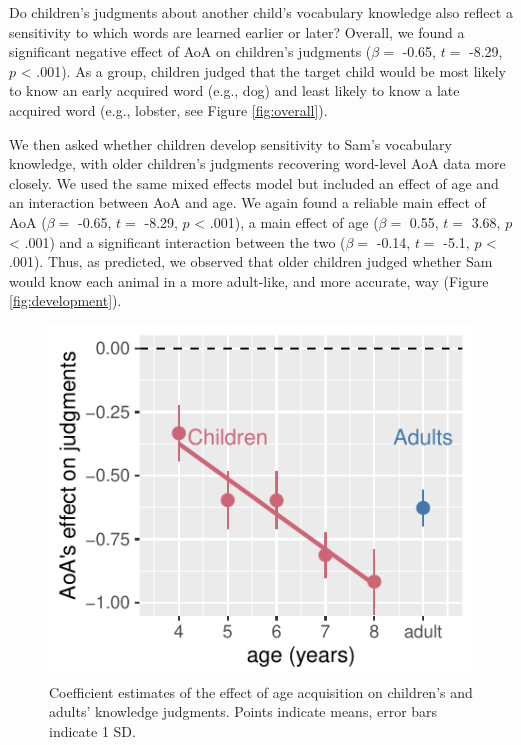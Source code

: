 \documentclass[10pt, letterpaper]{article}
\newenvironment{CodeChunk}{}{}
\begin{document}
Do children's judgments about another child's vocabulary knowledge also
reflect a sensitivity to which words are learned earlier or later?
Overall, we found a significant negative effect of AoA on children's
judgments (\(\beta =\) -0.65, \(t =\) -8.29, \(p\) \textless{} .001). As
a group, children judged that the target child would be most likely to
know an early acquired word (e.g., dog) and least likely to know a late
acquired word (e.g., lobster, see Figure \ref{fig:overall}).

We then asked whether children develop sensitivity to Sam's vocabulary
knowledge, with older children's judgments recovering word-level AoA
data more closely. We used the same mixed effects model but included an
effect of age and an interaction between AoA and age. We again found a
reliable main effect of AoA (\(\beta =\) -0.65, \(t =\) -8.29, \(p\)
\textless{} .001), a main effect of age (\(\beta =\) 0.55, \(t =\) 3.68,
\(p\) \textless{} .001) and a significant interaction between the two
(\(\beta =\) -0.14, \(t =\) -5.1, \(p\) \textless{} .001). Thus, as
predicted, we observed that older children judged whether Sam would know
each animal in a more adult-like, and more accurate, way (Figure
\ref{fig:development}).

\begin{CodeChunk}
\begin{figure}[tb]
\includegraphics{figs/age_terms-1} \caption[Coefficient estimates of the effect of age acquisition on children's and adults' knowledge judgments]{Coefficient estimates of the effect of age acquisition on children's and adults' knowledge judgments. Points indicate means, error bars indicate 1 SD.}\label{fig:age_terms}
\end{figure}
\end{CodeChunk}
\end{document}
